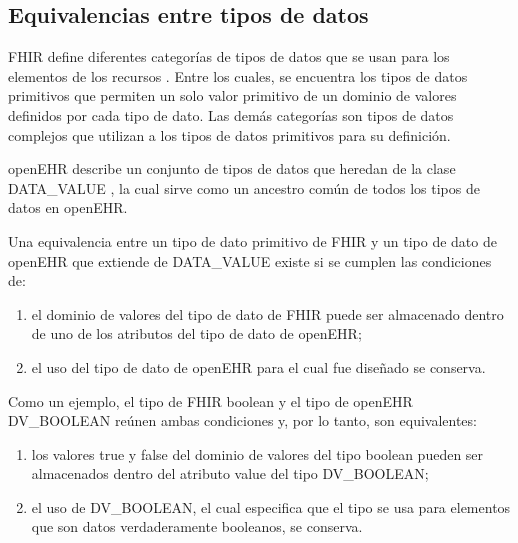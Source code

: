 \subsection{Equivalencias entre tipos de datos}

FHIR define diferentes categorías de tipos de datos que se usan para los elementos de los recursos \cite{FHIRDataTypes}. Entre los cuales, se encuentra los tipos de datos primitivos que permiten un solo valor primitivo de un dominio de valores definidos por cada tipo de dato. Las demás categorías son tipos de datos complejos que utilizan a los tipos de datos primitivos para su definición.

openEHR describe un conjunto de tipos de datos que heredan de la clase DATA\_VALUE \cite{openEHRDataTypes}, la cual sirve como un ancestro común de todos los tipos de datos en openEHR.

Una equivalencia entre un tipo de dato primitivo de FHIR y un tipo de dato de openEHR que extiende de DATA\_VALUE existe si se cumplen las condiciones de:

\begin{enumerate}
  \item el dominio de valores del tipo de dato de FHIR puede ser almacenado dentro de uno de los atributos del tipo de dato de openEHR;
  \item el uso del tipo de dato de openEHR para el cual fue diseñado se conserva.
\end{enumerate}

Como un ejemplo, el tipo de FHIR boolean y el tipo de openEHR DV\_BOOLEAN reúnen ambas condiciones y, por lo tanto, son equivalentes:
\begin{enumerate}
  \item los valores true y false del dominio de valores del tipo boolean pueden ser almacenados dentro del atributo value del tipo DV\_BOOLEAN;
  \item el uso de DV\_BOOLEAN, el cual especifica que el tipo se usa para elementos que son datos verdaderamente booleanos, se conserva.
\end{enumerate}
